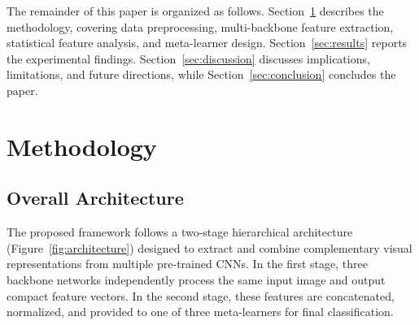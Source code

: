 \documentclass[pdflatex,sn-basic]{sn-jnl}
\begin{document}
The remainder of this paper is organized as follows. Section~\ref{sec:methodology} describes the methodology, covering data preprocessing, multi-backbone feature extraction, statistical feature analysis, and meta-learner design. Section~\ref{sec:results} reports the experimental findings. Section~\ref{sec:discussion} discusses implications, limitations, and future directions, while Section~\ref{sec:conclusion} concludes the paper.

\section{Methodology}
\label{sec:methodology}

\subsection{Overall Architecture}
\label{subsec:architecture}

The proposed framework follows a two-stage hierarchical architecture (Figure~\ref{fig:architecture}) designed to extract and combine complementary visual representations from multiple pre-trained CNNs. In the first stage, three backbone networks independently process the same input image and output compact feature vectors. In the second stage, these features are concatenated, normalized, and provided to one of three meta-learners for final classification.
\end{document}
